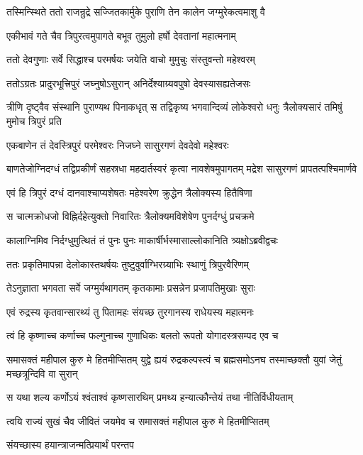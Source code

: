 \twolineshloka
{तस्मिन्स्थिते ततो राजन्रुद्रे सज्जितकार्मुके}
{पुराणि तेन कालेन जग्मुरेकत्वमाशु वै}


\twolineshloka
{एकीभावं गते चैव त्रिपुरत्वमुपागते}
{बभूव तुमुलो हर्षो देवतानां महात्मनाम्}


\twolineshloka
{ततो देवगुणाः सर्वे सिद्धाश्च परमर्षयः}
{जयेति वाचो मुमुचुः संस्तुवन्तो महेश्वरम्}


\twolineshloka
{ततोऽग्रतः प्रादुरभूत्त्रिपुरं जघ्नुषोऽसुरान्}
{अनिर्देश्याग्र्यवपुषो देवस्यासह्यतेजसः}


\threelineshloka
{त्रीणि दृष्ट्वैव संस्थानि पुराण्यथ पिनाकधृत्}
{स तद्विकृष्य भगवान्दिव्यं लोकेश्वरो धनुः}
{त्रैलोक्यसारं तमिषुं मुमोच त्रिपुरं प्रति}


\twolineshloka
{एकबाणेन तं देवस्त्रिपुरं परमेश्वरः}
{निजघ्ने सासुरगणं देवदेवो महेश्वरः}


\threelineshloka
{बाणतेजोग्निदग्धं तद्विप्रकीर्णं सहस्रधा}
{महदार्तस्वरं कृत्वा नावशेषमुपागतम्}
{मद्रेश सासुरगणं प्रापतत्पश्चिमार्णवे}


\twolineshloka
{एवं हि त्रिपुरं दग्धं दानवाश्चाप्यशेषतः}
{महेश्वरेण क्रुद्धेन त्रैलोक्यस्य हितैषिणा}


\twolineshloka
{स चात्मक्रोधजो विह्निर्दहेत्युक्तो निवारितः}
{त्रैलोक्यमविशेषेण पुनर्दग्धुं प्रचक्रमे}


\twolineshloka
{कालाग्निमिव निर्दग्धुमुत्थितं तं पुनः पुनः}
{माकार्षीर्भस्मासाल्लोकानिति त्र्यक्षोऽब्रवीद्वचः}


\twolineshloka
{ततः प्रकृतिमापन्ना देलोकास्तथर्षयः}
{तुष्टुवुर्वाग्भिरग्र्याभिः स्थाणुं त्रिपुरवैरिणम्}


\twolineshloka
{तेऽनुज्ञाता भगवता सर्वे जग्मुर्यथागतम्}
{कृतकामाः प्रसन्नेन प्रजापतिमुखाः सुराः}


\twolineshloka
{एवं रुद्रस्य कृतवान्सारथ्यं तु पितामहः}
{संयच्छ तुरगानस्य राधेयस्य महात्मनः}


\twolineshloka
{त्वं हि कृष्णाच्च कर्णाच्च फल्गुनाच्च गुणाधिकः}
{बलतो रूपतो योगादस्त्रसम्पद एव च}


\threelineshloka
{समासक्तं महीपाल कुरु मे हितमीप्सितम्}
{युद्वे ह्ययं रुद्रकल्पस्त्वं च ब्रह्मसमोऽनघ}
{तस्माच्छक्तौ युवां जेतुं मच्छत्रून्दिवि वा सुरान्}


\twolineshloka
{स यथा शल्य कर्णोऽयं श्वंताश्वं कृष्णसारथिम्}
{प्रमथ्य हन्यात्कौन्तेयं तथा नीतिर्विधीयताम्}


\twolineshloka
{त्वयि राज्यं सुखं चैव जीवितं जयमेव च}
{समासक्तं महीपाल कुरु मे हितमीप्सितम्}


संयच्छास्य हयान्त्राजन्मत्प्रियार्थं परन्तप
